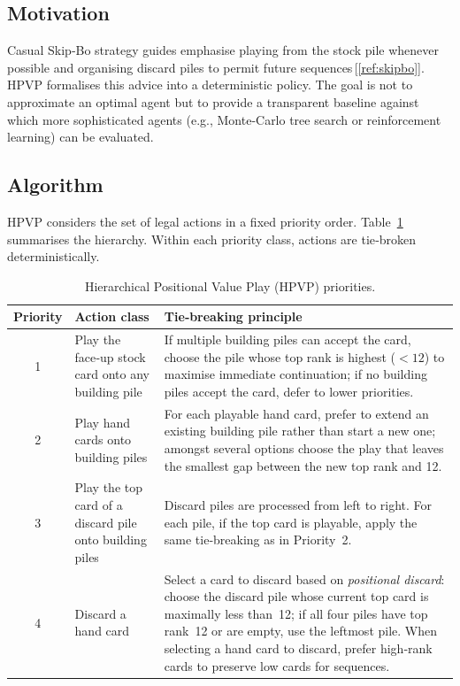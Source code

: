 \documentclass[11pt]{article}
\begin{document}
\subsection{Motivation}
Casual Skip‑Bo strategy guides emphasise playing from the stock pile whenever possible and organising discard piles to permit future sequences\,[\ref{ref:skipbo}]. HPVP formalises this advice into a deterministic policy. The goal is not to approximate an optimal agent but to provide a transparent baseline against which more sophisticated agents (e.g., Monte‑Carlo tree search or reinforcement learning) can be evaluated.

\subsection{Algorithm}
HPVP considers the set of legal actions in a fixed priority order. Table~\ref{tab:hpvp} summarises the hierarchy. Within each priority class, actions are tie‑broken deterministically.

\begin{table}[ht]
\centering
{\small
\begin{tabular}{@{}c p{} p{}@{}}
\toprule
\textbf{Priority} & \textbf{Action class} & \textbf{Tie‑breaking principle} \\\midrule
1 & Play the face‑up stock card onto any building pile & If multiple building piles can accept the card, choose the pile whose top rank is highest ($<12$) to maximise immediate continuation; if no building piles accept the card, defer to lower priorities. \\
2 & Play hand cards onto building piles & For each playable hand card, prefer to extend an existing building pile rather than start a new one; amongst several options choose the play that leaves the smallest gap between the new top rank and 12. \\
3 & Play the top card of a discard pile onto building piles & Discard piles are processed from left to right. For each pile, if the top card is playable, apply the same tie‑breaking as in Priority~2. \\
4 & Discard a hand card & Select a card to discard based on \emph{positional discard}: choose the discard pile whose current top card is maximally less than 12; if all four piles have top rank 12 or are empty, use the leftmost pile. When selecting a hand card to discard, prefer high‑rank cards to preserve low cards for sequences. \\
\bottomrule
\end{tabular}
}
\caption{Hierarchical Positional Value Play (HPVP) priorities.}
\label{tab:hpvp}
\end{table}
\end{document}
